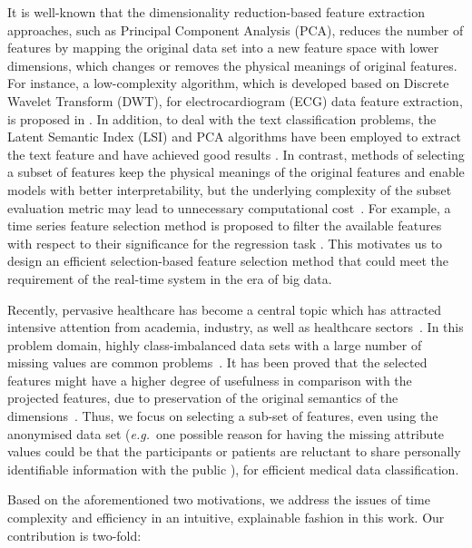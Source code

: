 \documentclass{article}
\newcommand{\zzeg}{\emph{e.g.}~}
\newcommand*{\1}{\textcolor{magenta}}
\begin{document}
It is well-known that the dimensionality reduction-based feature extraction approaches, such as Principal Component Analysis (PCA), reduces the number of features by mapping the original data set into a new feature space with lower dimensions, which changes or removes the physical meanings of original features. For instance, a low-complexity algorithm, which is developed based on Discrete Wavelet Transform (DWT), for electrocardiogram (ECG) data feature extraction, is proposed in \cite{mazomenos2013low}. In addition, to deal with the text classification problems, the Latent Semantic Index (LSI) \cite{dumais2004latent} and PCA algorithms have been employed to extract the text feature and have achieved good results \cite{levy2002least}. In contrast, methods of selecting a subset of features keep the physical meanings of the original features and enable models with better interpretability, but the underlying complexity of the subset evaluation metric may lead to unnecessary computational cost~\cite{JENSEN20151}. For example, a time series feature selection method is proposed to filter the available features with respect to their significance for the regression task \cite{christ2016distributed}. This motivates us to design an efficient selection-based feature selection method that could meet the requirement of the real-time system in the era of big data. 
	
	Recently, pervasive healthcare has become a central topic which has attracted intensive attention from academia, industry, as well as healthcare sectors~\cite{li2019bayesian,lu2020machine,livieris2019improving,tang2019construction,aydin2019construction,yang2018new,elyan2017genetic,apicella2019simple}. In this problem domain, highly class-imbalanced data sets with a large number of missing values are common problems~\cite{CervicalCancerDS2017}. It has been proved that the selected features might have a higher degree of usefulness in comparison with the projected features, due to preservation of the original semantics of the dimensions~\cite{8361067,liu2014feature}. Thus, we focus on selecting a sub-set of features, even using the anonymised data set (\zzeg one possible reason for having the missing attribute values could be that the participants or patients are reluctant to share personally identifiable information with the public \cite{CervicalCancerDS2017}), for efficient medical data classification.
	
	Based on the aforementioned two motivations, we address the issues of time complexity and efficiency in an intuitive, explainable fashion in this work. Our contribution is two-fold:
	
\end{document}
